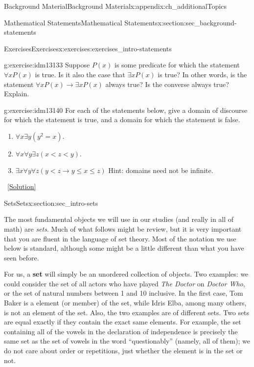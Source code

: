 \documentclass[oneside,10pt,]{book}
\newcommand{\terminology}[1]{\textbf{#1}}
\numberwithin{equation}{chapter}
\def\imp{\rightarrow}
\newcommand{\lt}{<}
\begin{document}
\begin{appendixptx}{Background Material}{}{Background Material}{}{}{x:appendix:ch_additionalTopics}
\begin{sectionptx}{Mathematical Statements}{}{Mathematical Statements}{}{}{x:section:sec_background-statements}
\begin{exercises-subsection}{Exercises}{}{Exercises}{}{}{x:exercises:exercises_intro-statements}
\begin{divisionexercise}{9}{}{}{g:exercise:idm13133}
Suppose \(P(x)\) is some predicate for which the statement \(\forall x P(x)\) is true. Is it also the case that \(\exists x P(x)\) is true? In other words, is the statement \(\forall x P(x) \imp \exists x P(x)\) always true? Is the converse always true? Explain.%
\end{divisionexercise}%
\begin{divisionexercise}{10}{}{}{g:exercise:idm13140}%
For each of the statements below, give a domain of discourse for which the statement is true, and a domain for which the statement is false.%
\par
%
\begin{enumerate}[label=(\alph*)]
\item{}\(\forall x \exists y (y^2 = x)\).%
\item{}\(\forall x \forall y \exists z (x \lt  z \lt  y)\).%
\item{}\(\exists x \forall y \forall z (y \lt  z \imp y \le x \le z)\) Hint: domains need not be infinite.%
\end{enumerate}
%
\qquad~\hfill{\tiny\hyperlink{g:solution:idm13151-main}{[Solution]}}\end{divisionexercise}%
\end{exercises-subsection}
\end{sectionptx}
%
%
\typeout{************************************************}
\typeout{************************************************}
%
\begin{sectionptx}{Sets}{}{Sets}{}{}{x:section:sec_intro-sets}
\begin{introduction}{}%
The most fundamental objects we will use in our studies (and really in all of math) are \emph{sets}. Much of what follows might be review, but it is very important that you are fluent in the language of set theory. Most of the notation we use below is standard, although some might be a little different than what you have seen before.%
\par
For us, a \terminology{set}  will simply be an unordered collection of objects. Two examples: we could consider the set of all actors who have played \emph{The Doctor} on \emph{Doctor Who}, or the set of natural numbers between 1 and 10 inclusive. In the first case, Tom Baker is a element (or member) of the set, while Idris Elba, among many others, is not an element of the set. Also, the two examples are of different sets. Two sets are equal exactly if they contain the exact same elements. For example, the set containing all of the vowels in the declaration of independence is precisely the same set as the set of vowels in the word ``questionably'' (namely, all of them); we do not care about order or repetitions, just whether the element is in the set or not.%

\end{introduction}
\end{sectionptx}
\end{appendixptx}
\end{document}
